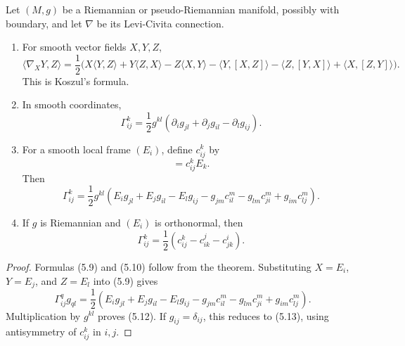 \begin{corollary}
\label{cor:formulas-levi-civita-connection}


Let $(M,g)$ be a Riemannian or pseudo-Riemannian manifold, possibly with
boundary, and let $\nabla$ be its Levi-Civita connection.
\begin{enumerate}
\item[(a)] For smooth vector fields $X,Y,Z$,
\begin{equation}
\langle\nabla_XY,Z\rangle
=\frac12\bigl(X\langle Y,Z\rangle+Y\langle Z,X\rangle-Z\langle X,Y\rangle
-\langle Y,[X,Z]\rangle-\langle Z,[Y,X]\rangle
+\langle X,[Z,Y]\rangle\bigr).
\tag{5.9}
\end{equation}
This is Koszul's formula.
\item[(b)] In smooth coordinates,
\begin{equation}
\Gamma^k_{ij}
=\frac12g^{kl}(\partial_ig_{jl}+\partial_jg_{il}-\partial_lg_{ij}).
\tag{5.10}
\end{equation}
\item[(c)] For a smooth local frame $(E_i)$, define $c^k_{ij}$ by
\begin{equation}
[E_i,E_j]=c^k_{ij}E_k.
\tag{5.11}
\end{equation}
Then
\begin{equation}
\Gamma^k_{ij}
=\frac12g^{kl}\left(E_ig_{jl}+E_jg_{il}-E_lg_{ij}
-g_{jm}c^m_{il}-g_{lm}c^m_{ji}+g_{im}c^m_{lj}\right).
\tag{5.12}
\end{equation}
\item[(d)] If $g$ is Riemannian and $(E_i)$ is orthonormal, then
\begin{equation}
\Gamma^k_{ij}=\frac12(c^k_{ij}-c^j_{ik}-c^i_{jk}).
\tag{5.13}
\end{equation}
\end{enumerate}

\begin{proof}
\sketch Formulas (5.9) and (5.10) follow from the theorem. Substituting
$X=E_i$, $Y=E_j$, and $Z=E_l$ into (5.9) gives
\[
\Gamma^q_{ij}g_{ql}
=\frac12\left(E_ig_{jl}+E_jg_{il}-E_lg_{ij}
-g_{jm}c^m_{il}-g_{lm}c^m_{ji}+g_{im}c^m_{lj}\right).
\]
Multiplication by $g^{kl}$ proves (5.12). If $g_{ij}=\delta_{ij}$, this
reduces to (5.13), using antisymmetry of $c^k_{ij}$ in $i,j$.
\end{proof}
\end{corollary}

